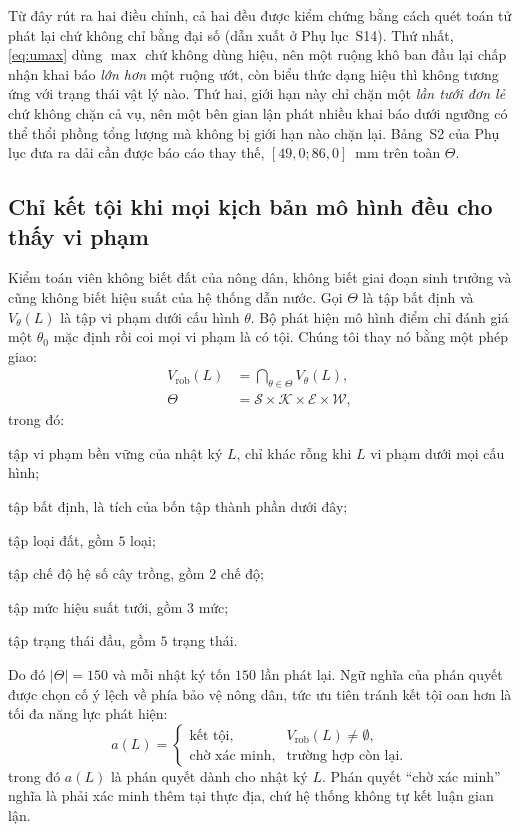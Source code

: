 Từ đây rút ra hai điều chỉnh, cả hai đều được kiểm chứng bằng cách quét toán tử
phát lại chứ không chỉ bằng đại số (dẫn xuất ở Phụ lục~S14). Thứ nhất,
\eqref{eq:umax} dùng $\max$ chứ không dùng hiệu, nên một ruộng khô ban đầu lại
chấp nhận khai báo \emph{lớn hơn} một ruộng ướt, còn biểu thức dạng hiệu thì
không tương ứng với trạng thái vật lý nào. Thứ hai, giới hạn này chỉ chặn một
\emph{lần tưới đơn lẻ} chứ không chặn cả vụ, nên một bên gian lận phát nhiều khai báo
dưới ngưỡng có thể thổi phồng tổng lượng mà không bị giới hạn nào chặn lại.
Bảng~S2 của Phụ lục đưa ra dải cần được báo cáo thay thế, $[49{,}0; 86{,}0]$~mm
trên toàn $\Theta$.

\subsection{Chỉ kết tội khi mọi kịch bản mô hình đều cho thấy vi phạm}
\label{sec:robust}

Kiểm toán viên không biết đất của nông dân, không biết giai đoạn sinh trưởng và
cũng không biết hiệu suất của hệ thống dẫn nước. Gọi $\Theta$ là tập bất định và
$V_\theta(L)$ là tập vi phạm dưới cấu hình $\theta$. Bộ phát hiện mô hình điểm
chỉ đánh giá một $\theta_0$ mặc định rồi coi mọi vi phạm là có tội. Chúng tôi
thay nó bằng một phép giao:
\begin{equation}
\begin{aligned}
V_{\mathrm{rob}}(L)&=\bigcap_{\theta\in\Theta}V_\theta(L),\\
\Theta&=\mathcal{S}\times\mathcal{K}\times\mathcal{E}\times\mathcal{W},
\end{aligned}
\label{eq:robust}
\end{equation}
trong đó:
\begin{symbolist}
\item[$V_{\mathrm{rob}}(L)$] tập vi phạm bền vững của nhật ký $L$, chỉ khác rỗng khi $L$ vi phạm dưới mọi cấu hình;
\item[$\Theta$] tập bất định, là tích của bốn tập thành phần dưới đây;
\item[$\mathcal{S}$] tập loại đất, gồm $5$ loại;
\item[$\mathcal{K}$] tập chế độ hệ số cây trồng, gồm $2$ chế độ;
\item[$\mathcal{E}$] tập mức hiệu suất tưới, gồm $3$ mức;
\item[$\mathcal{W}$] tập trạng thái đầu, gồm $5$ trạng thái.
\end{symbolist}

Do đó $|\Theta|=150$ và mỗi nhật ký tốn $150$ lần phát lại. Ngữ nghĩa của phán quyết được chọn cố ý lệch về phía bảo vệ nông dân, tức ưu tiên
tránh kết tội oan hơn là tối đa năng lực phát hiện:
\begin{equation}
a(L)=
\begin{cases}
\text{kết tội}, & V_{\mathrm{rob}}(L)\neq\emptyset,\\
\text{chờ xác minh}, & \text{trường hợp còn lại}.
\end{cases}
\label{eq:verdict}
\end{equation}
trong đó $a(L)$ là phán quyết dành cho nhật ký $L$. Phán quyết ``chờ xác minh''
nghĩa là phải xác minh thêm tại thực địa, chứ hệ thống không tự kết luận gian lận.

